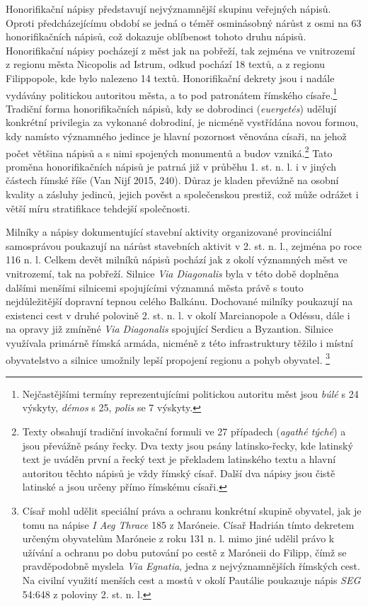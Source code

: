 Honorifikační nápisy představují nejvýznamnější skupinu veřejných nápisů. Oproti předcházejícímu období se jedná o téměř osminásobný nárůst z osmi na 63 honorifikačních nápisů, což dokazuje oblíbenost tohoto druhu nápisů. Honorifikační nápisy pocházejí z měst jak na pobřeží, tak zejména ve vnitrozemí z regionu města Nicopolis ad Istrum, odkud pochází 18 textů, a z regionu Filippopole, kde bylo nalezeno 14 textů. Honorifikační dekrety jsou i nadále vydávány politickou autoritou města, a to pod patronátem římského císaře.\footnote{Nejčastějšími termíny reprezentujícími politickou autoritu měst jsou {\em búlé} s 24 výskyty, {\em démos} s 25, {\em polis} se 7 výskyty.} Tradiční forma honorifikačních nápisů, kdy se dobrodinci ({\em euergetés}) udělují konkrétní privilegia za vykonané dobrodiní, je nicméně vystřídána novou formou, kdy namísto významného jedince je hlavní pozornost věnována císaři, na jehož počet většina nápisů a s nimi spojených monumentů a budov vzniká.\footnote{Texty obsahují tradiční invokační formuli ve 27 případech ({\em agathé týché}) a jsou převážně psány řecky. Dva texty jsou psány latinsko-řecky, kde latinský text je uváděn první a řecký text je překladem latinského textu a hlavní autoritou těchto nápisů je vždy římský císař. Další dva nápisy jsou čistě latinské a jsou určeny přímo římskému císaři.} Tato proměna honorifikačních nápisů je patrná již v průběhu 1. st. n. l. i v jiných částech římské říše (Van Nijf 2015, 240). Důraz je kladen převážně na osobní kvality a zásluhy jedinců, jejich pověst a společenskou prestiž, což může odrážet i větší míru stratifikace tehdejší společnosti.

Milníky a nápisy dokumentující stavební aktivity organizované provinciální samosprávou poukazují na nárůst stavebních aktivit v 2. st. n. l., zejména po roce 116 n. l. Celkem devět milníků nápisů pochází jak z okolí významných měst ve vnitrozemí, tak na pobřeží. Silnice {\em Via Diagonalis} byla v této době doplněna dalšími menšími silnicemi spojujícími významná města právě s touto nejdůležitější dopravní tepnou celého Balkánu. Dochované milníky poukazují na existenci cest v druhé polovině 2. st. n. l. v okolí Marcianopole a Odéssu, dále i na opravy již zmíněné {\em Via Diagonalis} spojující Serdicu a Byzantion. Silnice využívala primárně římská armáda, nicméně z této infrastruktury těžilo i místní obyvatelstvo a silnice umožnily lepší propojení regionu a pohyb obyvatel. \footnote{Císař mohl udělit speciální práva a ochranu konkrétní skupině obyvatel, jak je tomu na nápise {\em I Aeg Thrace} 185 z Maróneie. Císař Hadrián tímto dekretem určeným obyvatelům Maróneie z roku 131 n. l. mimo jiné udělil právo k užívání a ochranu po dobu putování po cestě z Maróneii do Filipp, čímž se pravděpodobně myslela {\em Via Egnatia}, jedna z nejvýznamnějších římských cest. Na civilní využití menších cest a mostů v okolí Pautálie poukazuje nápis {\em SEG} 54:648 z poloviny 2. st. n. l.}

